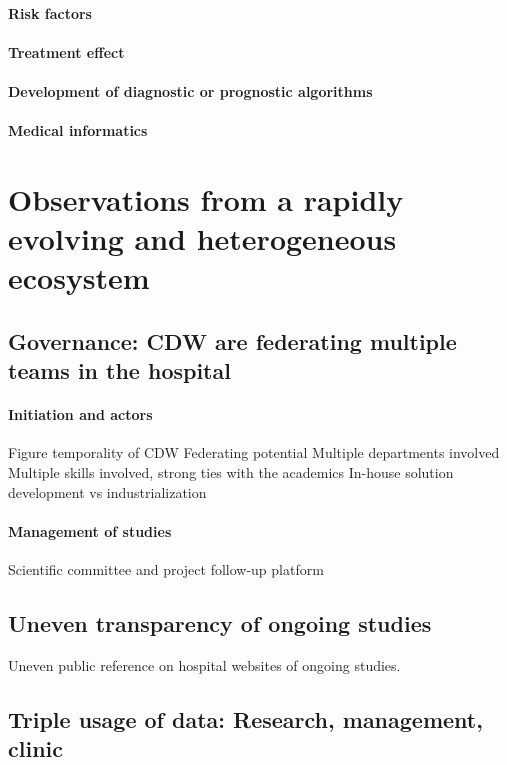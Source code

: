 \documentclass{report}
\begin{document}
\paragraph{Risk factors}
\paragraph{Treatment effect}
\paragraph{Development of diagnostic or prognostic algorithms}
\paragraph{Medical informatics}


\section{Observations from a rapidly evolving and heterogeneous
  ecosystem}\label{sec:cdw:results}

\subsection{Governance: CDW are federating multiple teams in the
  hospital}\label{subsec:cdw:results:governance}
\paragraph{Initiation and actors}
Figure temporality of CDW
Federating potential
Multiple departments involved
Multiple skills involved, strong ties with the academics
In-house solution development vs industrialization

\paragraph{Management of studies}

Scientific committee and project follow-up platform

\subsection{Uneven transparency of ongoing
  studies}\label{subsec:cdw:results:transparency} Uneven public reference on
hospital websites of ongoing studies.

\subsection{Triple usage of data: Research, management,
  clinic}\label{subsec:cdw:results:data}
\end{document}
